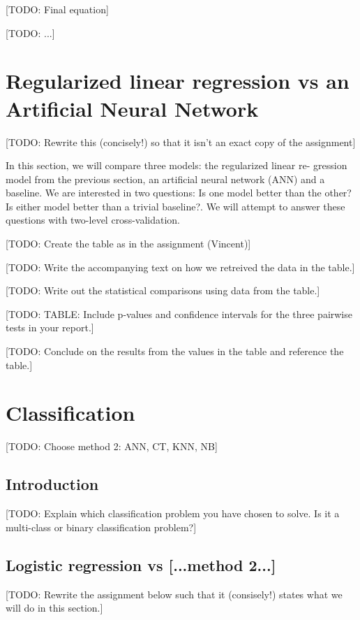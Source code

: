 \documentclass[dtu]{dtuarticle}
\newcommand{\todo}[1]{\color{red}[TODO: #1]\color{black}}
\begin{document}
	\todo{Final equation}

	\todo{...}

	\section{Regularized linear regression vs an Artificial Neural Network}

	\todo{Rewrite this (concisely!) so that it isn't an exact copy of the assignment}

	In this section, we will compare three models: the regularized linear re-
	gression model from the previous section, an artificial neural network (ANN) and a baseline. We
	are interested in two questions: Is one model better than the other? Is either model better than
	a trivial baseline?. We will attempt to answer these questions with two-level cross-validation.

	\todo{Create the table as in the assignment (Vincent)}

	\todo{Write the accompanying text on how we retreived the data in the table.}

	\todo{Write out the statistical comparisons using data from the table.}

	\todo{TABLE: Include p-values and confidence intervals for the three pairwise tests in your report.}

	\todo{Conclude on the results from the values in the table and reference the table.}


	\section{Classification}

	\todo{Choose method 2: ANN, CT, KNN, NB}

	\subsection{Introduction}

	\todo{Explain which classification problem you have chosen to solve. Is it a multi-class or binary
		classification problem?}

	\subsection{Logistic regression vs [...method 2...]}

	\todo{Rewrite the assignment below such that it (consisely!) states what we will do in this section.}
\end{document}
